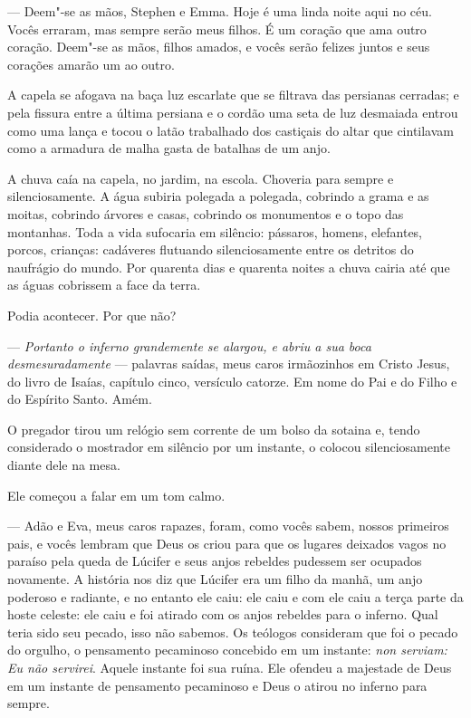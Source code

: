  --- Deem"-se as mãos, Stephen e Emma. Hoje é uma linda noite aqui no céu.
Vocês erraram, mas sempre serão meus filhos. É um coração que ama outro
coração. Deem"-se as mãos, filhos amados, e vocês serão felizes juntos e
seus corações amarão um ao outro.

A capela se afogava na baça luz escarlate que se filtrava das persianas
cerradas; e pela fissura entre a última persiana e o cordão uma seta de
luz desmaiada entrou como uma lança e tocou o latão trabalhado dos
castiçais do altar que cintilavam como a armadura de malha gasta de
batalhas de um anjo.

A chuva caía na capela, no jardim, na escola. Choveria para sempre e
silenciosamente. A água subiria polegada a polegada, cobrindo a grama e
as moitas, cobrindo árvores e casas, cobrindo os monumentos e o topo
das montanhas. Toda a vida sufocaria em silêncio: pássaros, homens,
elefantes, porcos, crianças: cadáveres flutuando silenciosamente entre
os detritos do naufrágio do mundo. Por quarenta dias e quarenta noites
a chuva cairia até que as águas cobrissem a face da terra.

Podia acontecer. Por que não?

 --- \textit{Portanto o inferno grandemente se alargou, e abriu a sua
boca desmesuradamente} --- palavras saídas, meus caros irmãozinhos em
Cristo Jesus, do livro de Isaías, capítulo cinco, versículo catorze. Em
nome do Pai e do Filho e do Espírito Santo. Amém.

O pregador tirou um relógio sem corrente de um bolso da sotaina e, tendo
considerado o mostrador em silêncio por um instante, o colocou
silenciosamente diante dele na mesa.

Ele começou a falar em um tom calmo.

 --- Adão e Eva, meus caros rapazes, foram, como vocês sabem, nossos
primeiros pais, e vocês lembram que Deus os criou para que os lugares
deixados vagos no paraíso pela queda de Lúcifer e seus anjos rebeldes
pudessem ser ocupados novamente. A história nos diz que Lúcifer era um
filho da manhã, um anjo poderoso e radiante, e no entanto ele caiu: ele
caiu e com ele caiu a terça parte da hoste celeste: ele caiu e foi
atirado com os anjos rebeldes para o inferno. Qual teria sido seu
pecado, isso não sabemos. Os teólogos consideram que foi o pecado do
orgulho, o pensamento pecaminoso concebido em um instante: \textit{non
serviam: Eu não servirei}. Aquele instante foi sua ruína. Ele ofendeu a
majestade de Deus em um instante de pensamento pecaminoso e Deus o
atirou no inferno para sempre.

